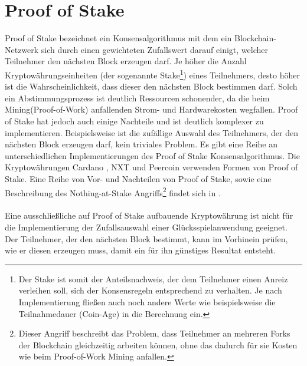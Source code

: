 \section{Proof of Stake }\label{pos}
Proof of Stake bezeichnet ein Konsensalgorithmus mit dem ein Blockchain-Netzwerk sich durch einen gewichteten Zufallswert darauf einigt, welcher Teilnehmer den nächsten Block erzeugen darf. Je höher die Anzahl Kryptowährungseinheiten (der sogenannte Stake\footnote{Der Stake ist somit der Anteilsnachweis, der dem Teilnehmer einen Anreiz verleihen soll, sich der Konsensregeln entsprechend zu verhalten. Je nach Implementierung fließen auch noch andere Werte wie beispielsweise die Teilnahmedauer (Coin-Age) in die Berechnung ein.}) eines Teilnehmers, desto höher ist die Wahrscheinlichkeit, dass dieser den nächsten Block bestimmen darf. Solch ein Abstimmungsprozess ist deutlich Ressourcen schonender, da die beim Mining(Proof-of-Work) anfallenden Strom- und Hardwarekosten wegfallen. Proof of Stake hat jedoch auch einige Nachteile und ist deutlich komplexer zu implementieren. Beispielsweise ist die zufällige Auswahl des Teilnehmers, der den nächsten Block erzeugen darf, kein triviales Problem. Es gibt eine Reihe an unterschiedlichen Implementierungen des Proof of Stake Konsensalgorithmus. Die Kryptowährungen Cardano \cite{coin_ada}, NXT \cite{coin_nxt} und Peercoin \cite{coin_peercoin} verwenden Formen von Proof of Stake. Eine Reihe von Vor- und Nachteilen von Proof of Stake, sowie eine Beschreibung des Nothing-at-Stake Angriffs\footnote{Dieser Angriff beschreibt das Problem, dass Teilnehmer an mehreren Forks der Blockchain gleichzeitig arbeiten können, ohne das dadurch für sie Kosten wie beim Proof-of-Work Mining anfallen.} findet sich in \cite{proof_of_stake}.\\\\
Eine ausschließliche auf Proof of Stake aufbauende Kryptowährung ist nicht für die Implementierung der Zufallsauswahl einer Glücksspielanwendung geeignet. Der Teilnehmer, der den nächsten Block bestimmt, kann im Vorhinein prüfen, wie er diesen erzeugen muss, damit ein für ihn günstiges Resultat entsteht.

